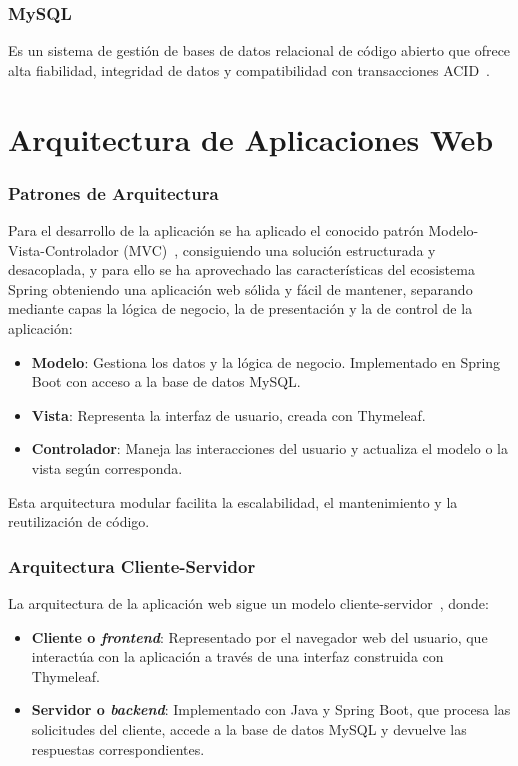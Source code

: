\subsubsection{MySQL~\cite{mysql}}
Es un sistema de gestión de bases de datos relacional de código abierto que ofrece alta fiabilidad, integridad de datos y compatibilidad con transacciones ACID~\cite{acid}.

\section{Arquitectura de Aplicaciones Web}

\subsubsection{Patrones de Arquitectura}
Para el desarrollo de la aplicación se ha aplicado el conocido patrón Modelo-Vista-Controlador (MVC)~\cite{modelo-vista-controrlador}, consiguiendo una solución estructurada y desacoplada, y para ello se ha aprovechado las características del ecosistema Spring obteniendo una aplicación web sólida y fácil de mantener, separando mediante capas la lógica de negocio, la de presentación y la de control de la aplicación:
\begin{itemize}
\tightlist
   \item \textbf{Modelo}: Gestiona los datos y la lógica de negocio. Implementado en Spring Boot con acceso a la base de datos MySQL.
   \item \textbf{Vista}: Representa la interfaz de usuario, creada con Thymeleaf.
   \item \textbf{Controlador}: Maneja las interacciones del usuario y actualiza el modelo o la vista según corresponda.
\end{itemize}
Esta arquitectura modular facilita la escalabilidad, el mantenimiento y la reutilización de código.

\subsubsection{Arquitectura Cliente-Servidor}
La arquitectura de la aplicación web sigue un modelo cliente-servidor~\cite{client-server-model}, donde:
\begin{itemize}
\tightlist
   \item \textbf{Cliente o \emph{frontend}}: Representado por el navegador web del usuario, que interactúa con la aplicación a través de una interfaz construida con Thymeleaf.
   \item \textbf{Servidor o \emph{backend}}: Implementado con Java y Spring Boot, que procesa las solicitudes del cliente, accede a la base de datos MySQL y devuelve las respuestas correspondientes.
\end{itemize}
